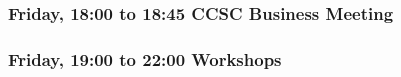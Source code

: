 \subsubsection*{Friday, 18:00 to 18:45 CCSC Business Meeting}


\subsubsection*{Friday, 19:00 to 22:00 Workshops}










